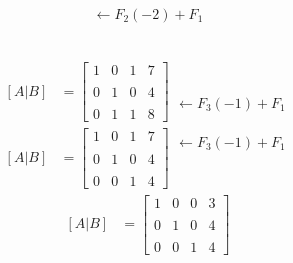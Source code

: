 \documentclass[10pt, a4paper]{article}
\begin{document}
\begin{multicols}{2}
\begin{align*}
  \begin{array}{r}
    \leftarrow F_2\left(-2\right)+F_1
    \\\\
    \\\\\\
  \end{array}
\end{align*}
\begin{align*}
  \left[A|B\right]&=\left[
    \begin{array}{ccc|c}
      1 & 0 & 1 & 7 \\\\
      0 & 1 & 0 & 4 \\\\
      0 & 1 & 1 & 8
    \end{array}
  \right]
  \begin{array}{r}
    \\\\
    \\\\
    \leftarrow F_3\left(-1\right)+F_1
  \end{array}
\end{align*}
\begin{align*}
  \left[A|B\right]&=\left[
    \begin{array}{ccc|c}
      1 & 0 & 1 & 7 \\\\
      0 & 1 & 0 & 4 \\\\
      0 & 0 & 1 & 4
    \end{array}
  \right]
  \begin{array}{r}
    \leftarrow F_3\left(-1\right)+F_1
    \\\\
    \\\\
    \\
  \end{array}
\end{align*}
\columnbreak
\begin{align*}
  \left[A|B\right]&=\left[
    \begin{array}{ccc|c}
      1 & 0 & 0 & 3 \\\\
      0 & 1 & 0 & 4 \\\\
      0 & 0 & 1 & 4
    \end{array}
  \right]
\end{align*}

\end{multicols}
\end{document}
